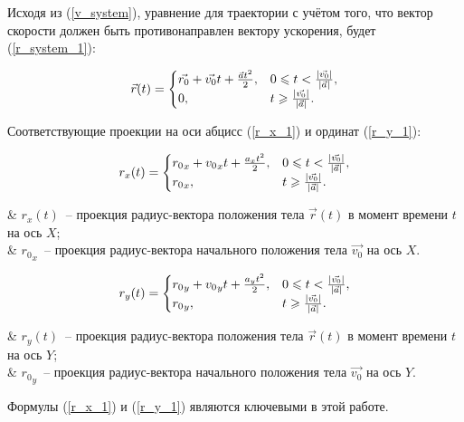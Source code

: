 Исходя из (\ref{v_system}), уравнение для траектории с учётом того, что вектор скорости должен быть
противонаправлен вектору ускорения, будет (\ref{r_system_1}):

\begin{equation}\label{r_system_1}
  \vec{r}(t) = \begin{cases}
    \vec{r_0} + \vec{v_0}t + \frac{\vec{a}t^2}{2}, & 0 \leqslant t < \frac{\left|\vec{v_0}\right|}{\left|\vec{a}\right|}, \\
    0,                                             & t \geqslant \frac{\left|\vec{v_0}\right|}{\left|\vec{a}\right|} .
  \end{cases}
\end{equation}

Соответствующие проекции на оси абцисс (\ref{r_x_1}) и ординат (\ref{r_y_1}):

\begin{equation}\label{r_x_1}
  r_x(t) =
  \begin{cases}
    {r_0}_x + {v_0}_x t + \frac{a_x t^2}{2}, & 0 \leqslant t < \frac{\left|\vec{v_0}\right|}{\left|\vec{a}\right|}, \\
    {r_0}_x,               & t \geqslant \frac{\left|\vec{v_0}\right|}{\left|\vec{a}\right|}.
  \end{cases}
\end{equation}
\begin{Underequation}
  & \(r_x(t)\)~-- проекция радиус-вектора положения тела \(\vec{r}(t)\) в момент времени \(t\) на ось \(X\); \\
  & \({r_0}_x\)~-- проекция радиус-вектора начального положения тела \(\vec{v_0}\) на ось \(X\). \\
\end{Underequation}

\begin{equation}\label{r_y_1}
  r_y(t) =
  \begin{cases}
    {r_0}_y + {v_0}_y t + \frac{a_y t^2}{2}, & 0 \leqslant t < \frac{\left|\vec{v_0}\right|}{\left|\vec{a}\right|}, \\
    {r_0}_y,               & t \geqslant \frac{\left|\vec{v_0}\right|}{\left|\vec{a}\right|}.
  \end{cases}
\end{equation}
\begin{Underequation}
  & \(r_y(t)\)~-- проекция радиус-вектора положения тела \(\vec{r}(t)\) в момент времени \(t\) на ось \(Y\); \\
  & \({r_0}_y\)~-- проекция радиус-вектора начального положения тела \(\vec{v_0}\) на ось \(Y\). \\
\end{Underequation}

Формулы (\ref{r_x_1}) и (\ref{r_y_1}) являются ключевыми в этой работе.
